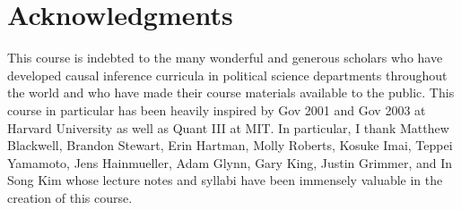 \documentclass[11pt, article, oneside]{memoir}
\theoremstyle{Assumption}
\begin{document}
\section*{Acknowledgments}

This course is indebted to the many wonderful and generous scholars who have developed causal inference curricula in political science departments throughout the world and who have made their course materials available to the public. This course in particular has been heavily inspired by Gov 2001 and Gov 2003 at Harvard University as well as Quant III at MIT. In particular, I thank Matthew Blackwell, Brandon Stewart, Erin Hartman, Molly Roberts, Kosuke Imai, Teppei Yamamoto, Jens Hainmueller, Adam Glynn, Gary King, Justin Grimmer, and In Song Kim whose lecture notes and syllabi have been immensely valuable in the creation of this course. 
\end{document}

